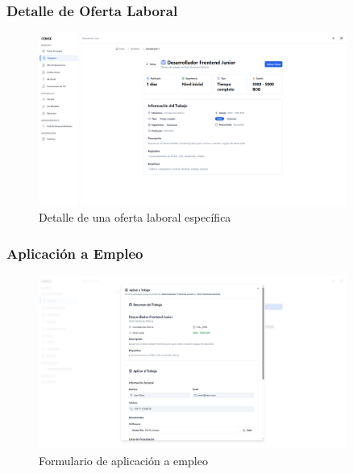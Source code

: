 \documentclass[12pt,a4paper]{article}
\begin{document}
\begin{enumerate}
\subsubsection{Detalle de Oferta Laboral}
\begin{figure}[H]
    \centering
    \includegraphics[width=0.9\textwidth]{screenshots/youth/job-detail.png}
    \caption{Detalle de una oferta laboral específica}
    \label{fig:youth-job-detail}
\end{figure}

\subsubsection{Aplicación a Empleo}
\begin{figure}[H]
    \centering
    \includegraphics[width=0.9\textwidth]{screenshots/youth/job-apply.png}
    \caption{Formulario de aplicación a empleo}
    \label{fig:youth-job-apply}
\end{figure}


\end{enumerate}
\end{document}
